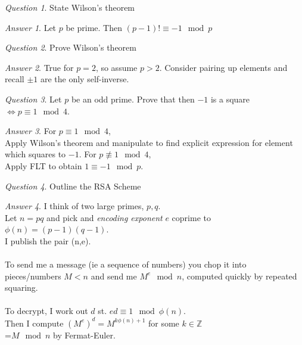 \documentclass[]{article}
\def\integers{\mathbb{Z}}
\theoremstyle{remark}
\theoremstyle{qnstyle}
\newtheorem{question}{Question}
\theoremstyle{answerstyle}
\newtheorem*{answer}{Answer}
\begin{document}
\begin{question}
    State Wilson's theorem
\end{question}
\begin{answer}
    Let $p$ be prime. Then $(p-1)! \equiv -1 \mod p$
\end{answer}

\begin{question}
    Prove Wilson's theorem
\end{question}
\begin{answer}
    True for $p = 2$, so assume $p > 2$. Consider pairing up elements and recall
     $\pm 1$ are the only self-inverse.
\end{answer}

\begin{question}
    Let $p$ be an odd prime. Prove that then $-1$ is a square $\iff p \equiv 1 \mod 4$.
\end{question}
\begin{answer}
    For $p \equiv 1 \mod 4$, \\
    Apply Wilson's theorem  and manipulate to find explicit expression for 
    element which squares to $-1$.
    For $p \not \equiv 1 \mod 4$, \\
    Apply FLT to obtain $1 \equiv -1 \mod p$.
\end{answer}

\begin{question}
    Outline the RSA Scheme
\end{question}
\begin{answer}
    I think of two large primes, $p,q$.\\
    Let $n =pq$ and pick and {\it encoding exponent} $e$ coprime to 
    $\phi(n) = (p-1)(q-1)$.\\
    I publish the pair (n,e).\\ \\
    To send me a message (ie a sequence of numbers) you
    chop it into pieces/numbers $M < n$ and send me
    $M^e \mod n$, computed quickly by repeated squaring.\\ \\
    To decrypt, I work out $d$ st. $ed \equiv 1 \mod \phi(n)$.\\
    Then I compute $(M^e)^d = M^{k\phi(n) + 1}$ for some $k \in \integers$ \\
    =$M \mod n$ by Fermat-Euler.
\end{answer}
\end{document}
